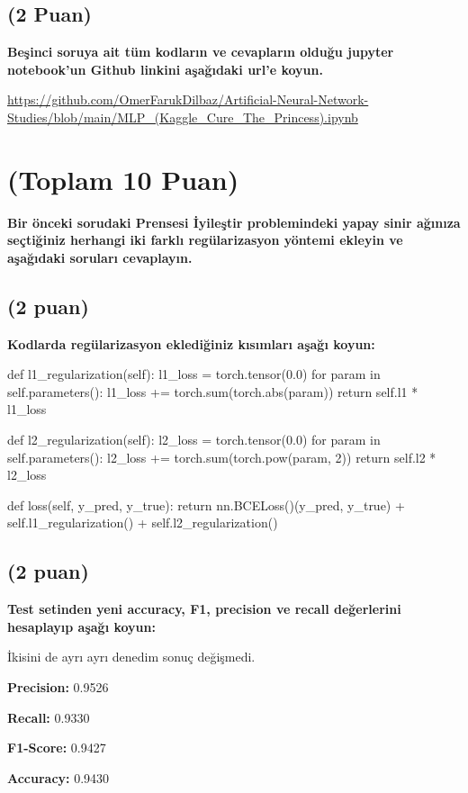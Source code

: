\documentclass[11pt]{article}
\begin{document}
\subsection{(2 Puan)} \textbf{Beşinci soruya ait tüm kodların ve cevapların olduğu jupyter notebook'un Github linkini aşağıdaki url'e koyun.}

\url{https://github.com/OmerFarukDilbaz/Artificial-Neural-Network-Studies/blob/main/MLP_(Kaggle_Cure_The_Princess).ipynb}

\section{(Toplam 10 Puan)} \textbf{Bir önceki sorudaki Prensesi İyileştir problemindeki yapay sinir ağınıza seçtiğiniz herhangi iki farklı regülarizasyon yöntemi ekleyin ve aşağıdaki soruları cevaplayın.} 

\subsection{(2 puan)} \textbf{Kodlarda regülarizasyon eklediğiniz kısımları aşağı koyun:} 

\begin{python}
def l1_regularization(self):
        l1_loss = torch.tensor(0.0)
        for param in self.parameters():
            l1_loss += torch.sum(torch.abs(param))
        return self.l1 * l1_loss

    def l2_regularization(self):
        l2_loss = torch.tensor(0.0)
        for param in self.parameters():
            l2_loss += torch.sum(torch.pow(param, 2))
        return self.l2 * l2_loss

    def loss(self, y_pred, y_true):
        return nn.BCELoss()(y_pred, y_true) + self.l1_regularization() + self.l2_regularization()
\end{python}

\subsection{(2 puan)} \textbf{Test setinden yeni accuracy, F1, precision ve recall değerlerini hesaplayıp aşağı koyun:}

İkisini de ayrı ayrı denedim sonuç değişmedi.

\textbf{Precision:} 0.9526

\textbf{Recall:} 0.9330

\textbf{F1-Score:} 0.9427

\textbf{Accuracy:} 0.9430
\end{document}
